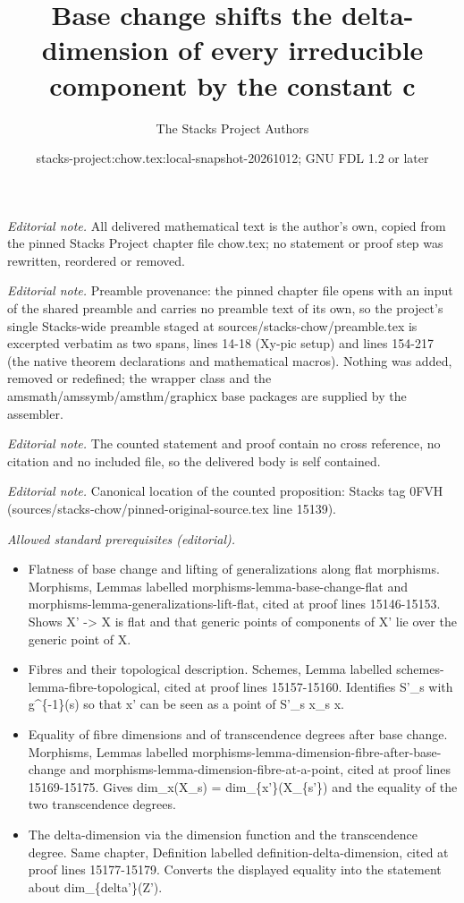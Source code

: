 \documentclass[10pt,a4paper]{amsart}
\title{Base change shifts the delta-dimension of every irreducible component by the constant c}
\author{The Stacks Project Authors}
\date{stacks-project:chow.tex:local-snapshot-20261012; GNU FDL 1.2 or later}
\theoremstyle{plain}
\theoremstyle{definition}
\theoremstyle{remark}
\numberwithin{equation}{subsection}
\begin{document}
\maketitle
\noindent\textit{Editorial note.} All delivered mathematical text is the author's own, copied from the pinned Stacks Project chapter file chow.tex; no statement or proof step was rewritten, reordered or removed.\par\medskip
\noindent\textit{Editorial note.} Preamble provenance: the pinned chapter file opens with an input of the shared preamble and carries no preamble text of its own, so the project's single Stacks-wide preamble staged at sources/stacks-chow/preamble.tex is excerpted verbatim as two spans, lines 14-18 (Xy-pic setup) and lines 154-217 (the native theorem declarations and mathematical macros). Nothing was added, removed or redefined; the wrapper class and the amsmath/amssymb/amsthm/graphicx base packages are supplied by the assembler.\par\medskip
\noindent\textit{Editorial note.} The counted statement and proof contain no cross reference, no citation and no included file, so the delivered body is self contained.\par\medskip
\noindent\textit{Editorial note.} Canonical location of the counted proposition: Stacks tag 0FVH (sources/stacks-chow/pinned-original-source.tex line 15139).\par\medskip
\noindent\textit{Allowed standard prerequisites (editorial).}\begin{itemize}
\item Flatness of base change and lifting of generalizations along flat morphisms. Morphisms, Lemmas labelled morphisms-lemma-base-change-flat and morphisms-lemma-generalizations-lift-flat, cited at proof lines 15146-15153. Shows X' -> X is flat and that generic points of components of X' lie over the generic point of X.
\item Fibres and their topological description. Schemes, Lemma labelled schemes-lemma-fibre-topological, cited at proof lines 15157-15160. Identifies S'\_s with g\textasciicircum{}\{-1\}(s) so that x' can be seen as a point of S'\_s x\_s x.
\item Equality of fibre dimensions and of transcendence degrees after base change. Morphisms, Lemmas labelled morphisms-lemma-dimension-fibre-after-base-change and morphisms-lemma-dimension-fibre-at-a-point, cited at proof lines 15169-15175. Gives dim\_x(X\_s) = dim\_\{x'\}(X\_\{s'\}) and the equality of the two transcendence degrees.
\item The delta-dimension via the dimension function and the transcendence degree. Same chapter, Definition labelled definition-delta-dimension, cited at proof lines 15177-15179. Converts the displayed equality into the statement about dim\_\{delta'\}(Z').
\end{itemize}\medskip
\end{document}
